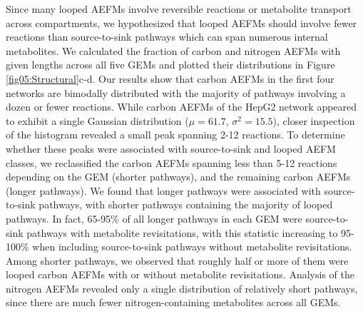 \documentclass[12pt]{article}
\begin{document}
Since many looped AEFMs involve reversible reactions or metabolite
transport across compartments, we hypothesized that looped AEFMs should
involve fewer reactions than source-to-sink pathways which can span
numerous internal metabolites. We calculated the fraction of carbon and
nitrogen AEFMs with given lengths across all five GEMs and plotted their
distributions in Figure \ref{fig05:Structural}c-d. Our results show that
carbon AEFMs in the first four networks are bimodally distributed with the
majority of pathways involving a dozen or fewer reactions. While carbon
AEFMs of the HepG2 network appeared to exhibit a single Gaussian
distribution ($\mu=61.7$, $\sigma^2=15.5$), closer inspection of the
histogram revealed a small peak spanning 2-12 reactions. To determine
whether these peaks were associated with source-to-sink and looped AEFM
classes, we reclassified the carbon AEFMs spanning less than 5-12
reactions depending on the GEM (shorter pathways), and the remaining
carbon AEFMs (longer pathways). We found that longer pathways were
associated with source-to-sink pathways, with shorter pathways containing
the majority of looped pathways. In fact, 65-95\% of all longer pathways
in each GEM were source-to-sink pathways with metabolite revisitations,
with this statistic increasing to 95-100\% when including source-to-sink
pathways without metabolite revisitations. Among shorter pathways, we
observed that roughly half or more of them were looped carbon AEFMs with
or without metabolite revisitations. Analysis of the nitrogen AEFMs
revealed only a single distribution of relatively short pathways, since
there are much fewer nitrogen-containing metabolites across all GEMs.
\end{document}
